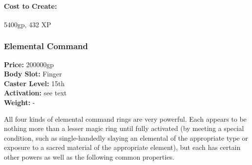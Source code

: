 \paragraph{Cost to Create:} 5400gp, 432 XP
% 
% 
% 

\subsubsection{Elemental Command}
\label{Item:ElementalCommand}
   \textbf{Price:} 200000gp
\\ \textbf{Body Slot:} Finger
\\ \textbf{Caster Level:} 15th
\\ \textbf{Activation:} see text
\\ \textbf{Weight:} -

All four kinds of elemental command rings are very powerful. 
Each appears to be nothing more than a lesser magic ring until fully activated (by meeting a special condition, such as single-handedly slaying an elemental of the appropriate type or exposure to a sacred material of the appropriate element), but each has certain other powers as well as the following common properties.

